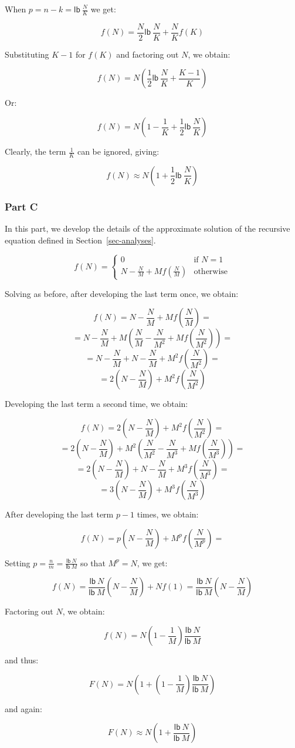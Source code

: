 When $p = n - k = \mathsf{lb}~\frac{N}{K}$ we get:

\[ f(N) = \frac{N}{2}\mathsf{lb}~\frac{N}{K} + \frac{N}{K}f(K)\]

Substituting $K-1$ for $f(K)$ and factoring out $N$, we obtain:

\[ f(N) = N(\frac{1}{2}\mathsf{lb}~\frac{N}{K} + \frac{K - 1}{K})\]

Or:

\[ f(N) = N(1 - \frac{1}{K} + \frac{1}{2}\mathsf{lb}~\frac{N}{K})\]

Clearly, the term $\frac{1}{K}$ can be ignored, giving:

\[ f(N) \approx N(1 + \frac{1}{2}\mathsf{lb}~\frac{N}{K})\]

\subsubsection*{Part C}
In this part, we develop the details of the approximate solution
of the recursive equation defined in Section~\ref{sec-analyses}.

\[ f(N) = \left\{ \begin{array}{ll}
                    0 & \mbox{if $N = 1$} \\
                    N - \frac{N}{M} + Mf(\frac{N}{M}) &\mbox{otherwise}
                  \end{array} \right. \]

Solving as before, after developing the last term once, we obtain:

\[ f(N) = N - \frac{N}{M} + Mf(\frac{N}{M}) = \]
\[ = N - \frac{N}{M} + M(\frac{N}{M} - \frac{N}{M^2} + Mf(\frac{N}{M^2})) = \]
\[ = N - \frac{N}{M} + N - \frac{N}{M} + M^2f(\frac{N}{M^2}) = \]
\[ = 2(N - \frac{N}{M}) + M^2f(\frac{N}{M^2}) \]

Developing the last term a second time, we obtain:

\[ f(N) = 2(N - \frac{N}{M}) + M^2f(\frac{N}{M^2}) = \]
\[ = 2(N - \frac{N}{M}) + M^2(\frac{N}{M^2} - \frac{N}{M^3} + Mf(\frac{N}{M^3})) = \]
\[ = 2(N - \frac{N}{M}) + N - \frac{N}{M} + M^3f(\frac{N}{M^3}) = \]
\[ = 3(N - \frac{N}{M}) + M^3f(\frac{N}{M^3}) \]

After developing the last term $p-1$ times, we obtain:

\[ f(N) = p(N - \frac{N}{M}) + M^pf(\frac{N}{M^p}) = \]

Setting $p = \frac{n}{m} = \frac{\mathsf{lb}~N}{\mathsf{lb}~M}$ so
that $M^p = N$, we get:

\[ f(N) = \frac{\mathsf{lb}~N}{\mathsf{lb}~M}(N - \frac{N}{M}) + Nf(1)
   = \frac{\mathsf{lb}~N}{\mathsf{lb}~M}(N - \frac{N}{M}) \]

Factoring out $N$, we obtain:

\[ f(N) = N(1 - \frac{1}{M})\frac{\mathsf{lb}~N}{\mathsf{lb}~M} \]

and thus:

\[ F(N) = N(1 + (1 - \frac{1}{M})\frac{\mathsf{lb}~N}{\mathsf{lb}~M}) \]

and again:

\[ F(N) \approx N(1 + \frac{\mathsf{lb}~N}{\mathsf{lb}~M}) \]
